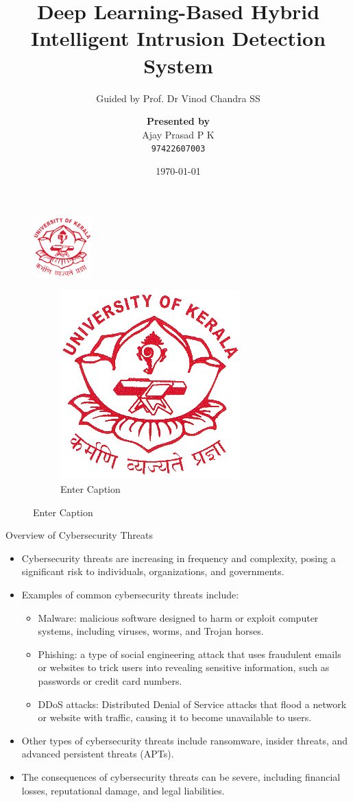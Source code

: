\documentclass{beamer}
\title[Intrusion Detection System]{Deep Learning-Based Hybrid Intelligent Intrusion Detection System}
\subtitle{Guided by Prof. Dr Vinod Chandra SS}
\author[Ajay Prasad P K]{\textbf{Presented by}\\ Ajay Prasad P K\\ \texttt{97422607003}}
\institute[97422607003]{DCS KU}
\date{\today}
\begin{document}
\begin{frame}
  \titlepage
  \begin{figure}
    \centering
    \includegraphics[width=0.2\textwidth]{Logo_of_University_of_Kerala.png}
\begin{figure}
      \centering
      \includegraphics[width=0.5\linewidth]{Logo_of_University_of_Kerala.png}
      \caption{Enter Caption}
      \label{fig:enter-label}
  \end{figure}
  \end{figure}
\end{frame}


\begin{frame}{Overview of Cybersecurity Threats}
  \begin{itemize}
    \item Cybersecurity threats are increasing in frequency and complexity, posing a significant risk to individuals, organizations, and governments.
    \item Examples of common cybersecurity threats include:
      \begin{itemize}
        \item Malware: malicious software designed to harm or exploit computer systems, including viruses, worms, and Trojan horses.
        \item Phishing: a type of social engineering attack that uses fraudulent emails or websites to trick users into revealing sensitive information, such as passwords or credit card numbers.
        \item DDoS attacks: Distributed Denial of Service attacks that flood a network or website with traffic, causing it to become unavailable to users.
      \end{itemize}
    \item Other types of cybersecurity threats include ransomware, insider threats, and advanced persistent threats (APTs).
    \item The consequences of cybersecurity threats can be severe, including financial losses, reputational damage, and legal liabilities.
  \end{itemize}
\end{frame}
\end{document}
